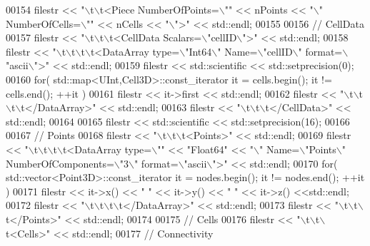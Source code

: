\begin{DoxyCode}
00154     filestr << \textcolor{stringliteral}{"\(\backslash\)t\(\backslash\)t<Piece NumberOfPoints=\(\backslash\)""} << nPoints << \textcolor{stringliteral}{"\(\backslash\)" NumberOfCells=\(\backslash\)""} << nCells << \textcolor{stringliteral}{"\(\backslash\)">"} << 
      std::endl;
00155 
00156     \textcolor{comment}{// CellData}
00157     filestr << \textcolor{stringliteral}{"\(\backslash\)t\(\backslash\)t\(\backslash\)t<CellData Scalars=\(\backslash\)"cellID\(\backslash\)">"} << std::endl;
00158     filestr << \textcolor{stringliteral}{"\(\backslash\)t\(\backslash\)t\(\backslash\)t\(\backslash\)t<DataArray type=\(\backslash\)"Int64\(\backslash\)" Name=\(\backslash\)"cellID\(\backslash\)" format=\(\backslash\)"ascii\(\backslash\)">"} << std::endl;
00159     filestr << std::scientific << std::setprecision(0);
00160     \textcolor{keywordflow}{for}( std::map<UInt,Cell3D>::const\_iterator it = cells.begin(); it != cells.end(); ++it )
00161         filestr << it->first << std::endl;
00162     filestr << \textcolor{stringliteral}{"\(\backslash\)t\(\backslash\)t\(\backslash\)t\(\backslash\)t</DataArray>"} << std::endl;
00163     filestr << \textcolor{stringliteral}{"\(\backslash\)t\(\backslash\)t\(\backslash\)t</CellData>"} << std::endl;
00164 
00165     filestr << std::scientific << std::setprecision(16);
00166 
00167     \textcolor{comment}{// Points}
00168     filestr << \textcolor{stringliteral}{"\(\backslash\)t\(\backslash\)t\(\backslash\)t<Points>"} << std::endl;
00169     filestr << \textcolor{stringliteral}{"\(\backslash\)t\(\backslash\)t\(\backslash\)t\(\backslash\)t<DataArray type=\(\backslash\)""} << \textcolor{stringliteral}{"Float64"} << \textcolor{stringliteral}{"\(\backslash\)" Name=\(\backslash\)"Points\(\backslash\)" NumberOfComponents=\(\backslash\)"3\(\backslash\)"
       format=\(\backslash\)"ascii\(\backslash\)">"} << std::endl;
00170     \textcolor{keywordflow}{for}( std::vector<Point3D>::const\_iterator it = nodes.begin(); it != nodes.end(); ++it )
00171         filestr << it->x() << \textcolor{stringliteral}{" "} << it->y() << \textcolor{stringliteral}{" "} << it->z() <<std::endl;
00172     filestr << \textcolor{stringliteral}{"\(\backslash\)t\(\backslash\)t\(\backslash\)t\(\backslash\)t</DataArray>"} << std::endl;
00173     filestr << \textcolor{stringliteral}{"\(\backslash\)t\(\backslash\)t\(\backslash\)t</Points>"} << std::endl;
00174 
00175     \textcolor{comment}{// Cells}
00176     filestr << \textcolor{stringliteral}{"\(\backslash\)t\(\backslash\)t\(\backslash\)t<Cells>"} << std::endl;
00177     \textcolor{comment}{//  Connectivity}

\end{DoxyCode}
